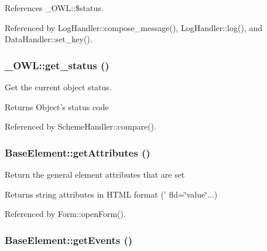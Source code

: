 References \_\-OWL::\$status.



Referenced by LogHandler::compose\_\-message(), LogHandler::log(), and DataHandler::set\_\-key().

\subsubsection[{get\_\-status}]{\setlength{\rightskip}{0pt plus 5cm}\_\-OWL::get\_\-status ()}\label{class__OWL_a99ec771fa2c5c279f80152cc09e489a8}
Get the current object status.

\begin{DoxyReturn}{Returns}
Object's status code 
\end{DoxyReturn}


Referenced by SchemeHandler::compare().

\subsubsection[{getAttributes}]{\setlength{\rightskip}{0pt plus 5cm}BaseElement::getAttributes ()}\label{classBaseElement_a25bed980efe965e95dc43d7c2fa1faca}
Return the general element attributes that are set \begin{DoxyReturn}{Returns}
string attributes in HTML format (' fld=\char`\"{}value\char`\"{}...) 
\end{DoxyReturn}


Referenced by Form::openForm().

\subsubsection[{getEvents}]{\setlength{\rightskip}{0pt plus 5cm}BaseElement::getEvents ()}\label{classBaseElement_a852277a83d867417f2e39e8a2483bac7}


